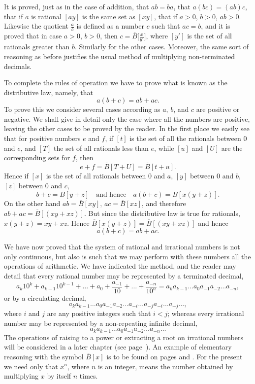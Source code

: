 \documentclass[a4paper,12pt]{book}[2004/02/16]
\theoremstyle{ilemma}
\theoremstyle{itheorem}
\theoremstyle{iother}
\theoremstyle{icorollary}
\theoremstyle{numcorollary}
\theoremstyle{idefinition}
\begin{document}
It is proved, just as in the case of addition, that $ab=ba$, that
$a(bc) = (ab)c$, that if $a$ is rational $[ay]$ is the same set as
$[xy]$, that if $a>0$, $b>0$, $ab>0$. Likewise the quotient
$\frac{a}{b}$ is defined as a number $c$ such that $ac=b$, and it is
proved that in case $a>0$, $b>0$, then
$c=\overline{B}\bigl[\frac{x}{y'}\bigr]$, where $[y']$ is the set of
all rationals greater than $b$. Similarly for the other
cases. Moreover, the same sort of reasoning as before justifies the
usual method of multiplying non-terminated decimals.

To complete the rules of operation we have to prove what
is known as the distributive law, namely, that
\[
  a(b+c)=ab+ac.
\]
To prove this we consider several cases according as $a$, $b$, and $c$
are positive or negative. We shall give in detail only the case where
all the numbers are positive, leaving the other cases to be proved by
the reader. In the first place we easily see that for positive numbers
$e$ and $f$, if $[t]$ is the set of all the rationals between 0 and
$e$, and $[T]$ the set of all rationals less than $e$, while $[u]$ and
$[U]$ are the corresponding sets for $f$, then
\[
  e+f = \overline{B}[T+U]=\overline{B}[t+u].
\]
Hence if $[x]$ is the set of all rationals between 0 and $a$, $[y]$
between 0 and $b$, $[z]$ between 0 and $c$,
\[
  b + c = \overline{B}[y+z] \quad \text{and hence} \quad
  a(b+c) = \overline{B}[x(y + z)].
\]
On the other hand $ab=\overline{B}[xy]$, $ac=\overline{B}[xz]$, and
therefore $ab+ac= \overline{B}[(xy+xz)]$. But since the distributive
law is true for rationals, $x(y+z)=xy+xz$. Hence
$\overline{B}[x(y+z)]=\overline{B}[(xy+xz)]$ and hence
\[
  a(b+c)=ab+ac.
\]

We have now proved that the system of rational and irrational numbers
is not only continuous, but also is such that we may perform with
these numbers all the operations of arithmetic.  We have indicated the
method, and the reader may
detail that every rational number may be represented by a terminated
decimal,
\[
  a_k 10^k+a_{k-1}10^{k-1}+\ldots+a_0+\frac{a_{-1}}{10}
  +\ldots+\frac{a_{-n}}{10^n}
  = a_k a_{k-1}\ldots a_0 a_{-1}a_{-2}\ldots a_{-n},
\]
or by a circulating decimal,
\[
  a_k a_{k-1}\ldots a_0 a_{-1}a_{-2}\ldots
  a_{-i}\ldots a_{-j}a_{-i}\ldots a_{-j}\ldots,
\]
where $i$ and $j$ are any positive integers such that $i<j$; whereas
every irrational number may be represented by a non-repeating infinite
decimal,
\[
  a_k a_{k-1}\ldots a_0 a_{-1}a_{-2}\ldots a_{-n}\ldots
\]
The operations of raising to a power or extracting a root on
irrational numbers will be considered in a later chapter (see
page~\pageref{s4p53}). An example of elementary reasoning with the
symbol $\overline{B}[x]$ is to be found on pages \pageref{t7p17} and
\pageref{endpf18}. For the present we need only that $x^n$, where $n$
is an integer, means the number obtained by multiplying $x$ by itself
$n$ times.
\end{document}

